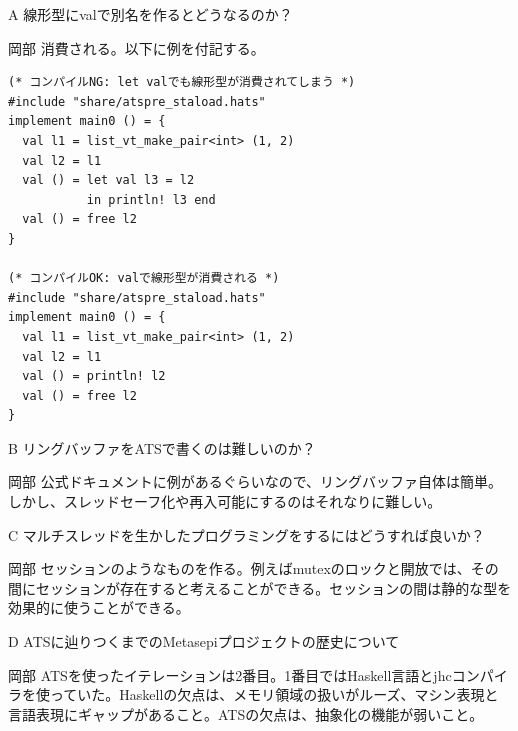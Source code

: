 \documentclass{ipsjprosym}
\begin{document}
\begin{QandA}
\item[A] 線形型にvalで別名を作るとどうなるのか？
\item[岡部] 消費される。以下に例を付記する。

\begin{verbatim}
(* コンパイルNG: let valでも線形型が消費されてしまう *)
#include "share/atspre_staload.hats"
implement main0 () = {
  val l1 = list_vt_make_pair<int> (1, 2)
  val l2 = l1
  val () = let val l3 = l2
           in println! l3 end
  val () = free l2
}

(* コンパイルOK: valで線形型が消費される *)
#include "share/atspre_staload.hats"
implement main0 () = {
  val l1 = list_vt_make_pair<int> (1, 2)
  val l2 = l1
  val () = println! l2
  val () = free l2
}
\end{verbatim}

\item[B] リングバッファをATSで書くのは難しいのか？
\item[岡部] 公式ドキュメントに例があるぐらいなので、リングバッファ自体は簡単。しかし、スレッドセーフ化や再入可能にするのはそれなりに難しい。
\item[C] マルチスレッドを生かしたプログラミングをするにはどうすれば良いか？
\item[岡部] セッションのようなものを作る。例えばmutexのロックと開放では、その間にセッションが存在すると考えることができる。セッションの間は静的な型を効果的に使うことができる。
\item[D] ATSに辿りつくまでのMetasepiプロジェクトの歴史について
\item[岡部] ATSを使ったイテレーションは2番目。1番目ではHaskell言語とjhcコンパイラを使っていた。Haskellの欠点は、メモリ領域の扱いがルーズ、マシン表現と言語表現にギャップがあること。ATSの欠点は、抽象化の機能が弱いこと。
\end{QandA}



\end{document}
